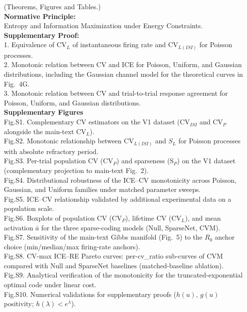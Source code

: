 \documentclass[sn-basic,Numbered]{sn-jnl}%
\theoremstyle{thmstyleone}%
\theoremstyle{thmstyletwo}%
\theoremstyle{thmstylethree}%
\begin{document}
(Theorems, Figures and Tables.)\\
\textbf{Normative Principle:} \\Entropy and Information Maximization under Energy Constraints.\\
\textbf{Supplementary Proof:}\\
1. Equivalence of $\text{CV}_L$ of instantaneous firing rate and $\text{CV}_{L(ISI)}$ for Poisson processes.\\
2. Monotonic relation between CV and ICE for Poisson, Uniform, and Gaussian distributions, including the Gaussian channel model for the theoretical curves in Fig.~4G.\\
3. Monotonic relation between CV and trial-to-trial response agreement for Poisson, Uniform, and Gaussian distributions.\\
\textbf{Supplementary Figures}\\
Fig.S1. Complementary CV estimators on the V1 dataset (CV$_{ISI}$ and CV$_P$ alongside the main-text CV$_L$).\\
Fig.S2. Monotonic relationship between CV$_{L(ISI)}$ and $S_L$ for Poisson processes with absolute refractory period.\\
Fig.S3. Per-trial population CV (CV$_P$) and sparseness (S$_P$) on the V1 dataset (complementary projection to main-text Fig.~2).\\
Fig.S4. Distributional robustness of the ICE--CV monotonicity across Poisson, Gaussian, and Uniform families under matched parameter sweeps.\\
Fig.S5. ICE--CV relationship validated by additional experimental data on a population scale.\\
Fig.S6. Boxplots of population CV (CV$_P$), lifetime CV (CV$_L$), and mean activation $\bar{a}$ for the three sparse-coding models (Null, SparseNet, CVM).\\
Fig.S7. Sensitivity of the main-text Gibbs manifold (Fig.~5) to the $R_0$ anchor choice (min/median/max firing-rate anchors).\\
Fig.S8. CV-max ICE--RE Pareto curves: per-cv\_ratio sub-curves of CVM compared with Null and SparseNet baselines (matched-baseline ablation).\\
Fig.S9. Analytical verification of the monotonicity for the truncated-exponential optimal code under linear cost.\\
Fig.S10. Numerical validations for supplementary proofs ($h(u)$, $g(u)$ positivity; $h(\lambda)<e^\lambda$).\\
\end{document}
